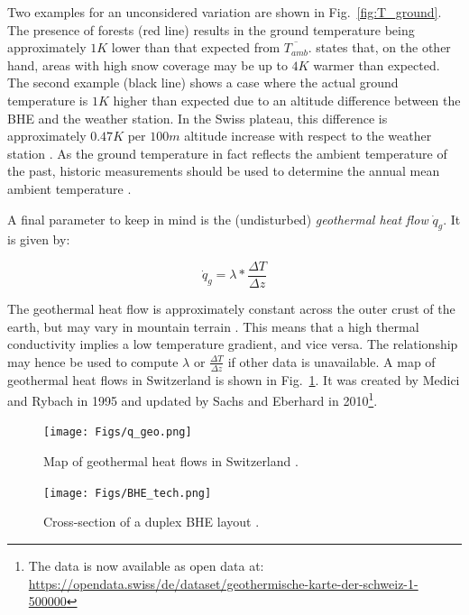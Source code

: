 Two examples for an unconsidered variation are shown in Fig.~\ref{fig:T_ground}. The presence of forests (red line) results in the ground temperature being approximately $1K$ lower than that expected from $\overline{T_{amb}}$. \citet{huber_bodentemperaturen_2014} states that, on the other hand, areas with high snow coverage may be up to $4K$ warmer than expected. The second example (black line) shows a case where the actual ground temperature is $1K$ higher than expected due to an altitude difference between the BHE and the weather station. In the Swiss plateau, this difference is approximately $0.47 K$ per $100m$ altitude increase with respect to the weather station \citep{huber_bodentemperaturen_2014}.
As the ground temperature in fact reflects the ambient temperature of the past, historic measurements should be used to determine the annual mean ambient temperature \citep{huber_bodentemperaturen_2014}. 

A final parameter to keep in mind is the (undisturbed) \textit{geothermal heat flow} $\dot{q}_{g}$. It is given by:

\begin{equation}
    \dot{q}_{g} = \lambda * \frac{\Delta T}{\Delta z}
\end{equation}

The geothermal heat flow is approximately constant across the outer crust of the earth, but may vary in mountain terrain \citep{huber_bodentemperaturen_2014}. This means that a high thermal conductivity  implies a low temperature gradient, and vice versa. The relationship may hence be used to compute $\lambda$ or $ \frac{\Delta T}{\Delta z}$ if other data is unavailable. A map of geothermal heat flows in Switzerland is shown in Fig.~\ref{fig:q_geo}. It was created by Medici and Rybach in 1995 and updated by Sachs and Eberhard in 2010\footnote{The data is now available as open data at:\\ \url{https://opendata.swiss/de/dataset/geothermische-karte-der-schweiz-1-500000}}.

\begin{figure}
    \centering
    \texttt{[image: Figs/q\_geo.png]}
    \caption[Map of geothermal heat flows in Switzerland]{Map of geothermal heat flows in Switzerland \citep{huber_bodentemperaturen_2014}.}
    \label{fig:q_geo}
\end{figure}

\begin{figure}[b]
    \centering
    \texttt{[image: Figs/BHE\_tech.png]}
    \caption[Cross-section of a duplex BHE layout.]{Cross-section of a duplex BHE layout \citep{wagner_erdsondenpotenzial_2014}.}
    \label{fig:BHE_cross-sec}
\end{figure}

